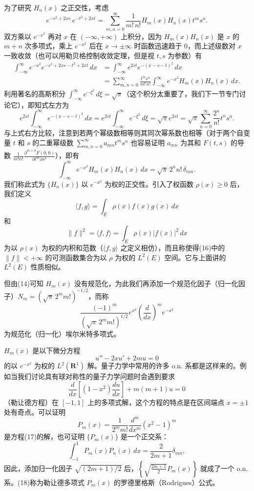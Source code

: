 为了研究 $H_n(x)$ 之正交性，考虑
\[
 e^{-s^2+2xs}\,e^{-t^2+2xt}
 =\sum_{m,n=0}^{\infty}\frac1{m!\,n!}H_m(x)H_n(x)t^ms^n.
\]
双方乘以 $e^{-x^2}$ 再对 $x$ 在 $(-\infty,+\infty)$ 上积分，因为 $H_m(x)H_n(x)$ 是 $x$ 的 $m+n$ 次多项式，乘上 $e^{-x^2}$ 后在 $x\to\pm\infty$ 时函数迅速趋于 $0$，而上述级数对 $x$ 一致收敛（也可以用勒贝格控制收敛定理，但是视 $t,s$ 为参数）有
\[
\begin{aligned}
 \int_{-\infty}^{\infty}e^{-x^2}e^{-s^2+2xs-t^2+2xt}\,dx
 &=\int_{-\infty}^{\infty}e^{2st}e^{-(x-s-t)^2}\,dx\\
 &=\sum_{m,n=0}^{\infty}\frac{t^ms^n}{m!\,n!}
 \int_{-\infty}^{\infty}e^{-x^2}H_m(x)H_n(x)\,dx.
\end{aligned}
\]
利用著名的高斯积分 $\int_{-\infty}^{\infty}e^{-\xi^2}\,d\xi=\sqrt\pi$（这个积分太重要了，我们下一节专门讨论它），即知式左方为
\[
 e^{2st}\int_{-\infty}^{\infty}e^{-(x-s-t)^2}\,dx
 =e^{2st}\int_{-\infty}^{\infty}e^{-\xi^2}\,d\xi
 =\sqrt\pi e^{2st}=\sqrt\pi\sum_{n=0}^{\infty}\frac{2^n}{n!}t^ns^n.
\]
与上式右方比较，注意到若两个幂级数相等则其同次幂系数也相等（对于两个自变量 $t$ 和 $s$ 的二重幂级数 $\sum_{m,n=0}^{\infty}a_{mn}t^ms^n$ 也容易证明 $a_{mn}$ 为其和 $F(t,s)$ 的导数 $\frac1{m!n!}\frac{\partial^{m+n}F(0,0)}{\partial t^m\partial s^n}$），即有
\begin{equation}
 \int_{-\infty}^{\infty}e^{-x^2}H_m(x)H_n(x)\,dx
 =\sqrt\pi\,2^n n!\,\delta_{mn}.
 \tag{14}
\end{equation}
我们称此式为 $\{H_n(x)\}$ 以 $e^{-x^2}$ 为权的正交性。引入了权函数 $\rho(x)\ge0$ 后，我们定义
\begin{equation}
 \langle f,g\rangle=\int_E\rho(x)f(x)\overline{g(x)}\,dx
 \tag{15}
\end{equation}
和
\begin{equation}
 \|f\|^2=\langle f,f\rangle=\int_E\rho(x)|f(x)|^2\,dx
 \tag{16}
\end{equation}
为以 $\rho(x)$ 为权的内积和范数（$\langle f,g\rangle$ 之定义相仿），而且称使得(16)中的 $\|f\|<+\infty$ 的可测函数集合为以 $\rho$ 为权的 $L^2(E)$ 空间。它与上面讲的 $L^2(E)$ 性质相似。

但由(14)可知 $H_m(x)$ 没有规范化，为此我们再添加一个规范化因子（归一化因子）$N_m=(\sqrt\pi\,2^m m!)^{-1/2}$，而称
\[
 \frac{(-1)^m}{(\sqrt\pi\,2^m m!)^{1/2}}e^{x^2}\left(\frac d{dx}\right)^me^{-x^2}
\]
为规范化（归一化）埃尔米特多项式。

$H_m(x)$ 是以下微分方程
\[
 u''-2xu'+2mu=0
\]
的以 $e^{-x^2}$ 为权的 $L^2(\mathbf R^1)$ 解。量子力学中常用的许多 o.n. 系都是这样来的。例如当我们讨论具有球对称性的量子力学问题时会遇到要求
\begin{equation}
 \frac d{dx}\left[(1-x^2)\frac{du}{dx}\right]+m(m+1)u=0
 \tag{17}
\end{equation}
（勒让德方程）在 $[-1,1]$ 上的多项式解，这个方程的特点是在区间端点 $x=\pm1$ 处有奇点。可以证明
\begin{equation}
 P_m(x)=\frac1{2^m m!}\frac{d^m}{dx^m}(x^2-1)^m
 \tag{18}
\end{equation}
是方程(17)的解，也可证明 $\{P_m(x)\}$ 是一个正交系：
\[
 \int_{-1}^1P_m(x)P_n(x)\,dx=\frac2{2m+1}\delta_{mn},
\]
因此，添加归一化因子 $\sqrt{(2m+1)/2}$ 后，$\left\{\sqrt{\frac{2m+1}{2}}P_m(x)\right\}$ 就成了一个 o.n. 系。(18)称为勒让德多项式 $P_m(x)$ 的罗德里格斯（Rodrigues）公式。

